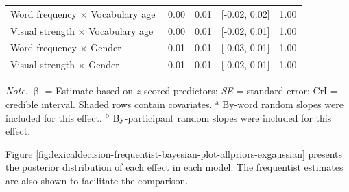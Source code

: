 \documentclass[
  12pt,
  man,floatsintext]{apa7}
\begin{document}
\begin{table}[!h]
\begin{threeparttable}
\begin{tabular}[t]{lrrrr}
\hspace{1em}Word frequency  $\times$  Vocabulary age & 0.00 & 0.01 & {}[-0.02, 0.02] & 1.00\\
\hspace{1em}Visual strength  $\times$  Vocabulary age & 0.00 & 0.01 & {}[-0.02, 0.01] & 1.00\\
\hspace{1em}Word frequency  $\times$  Gender & -0.01 & 0.01 & {}[-0.03, 0.01] & 1.00\\
\hspace{1em}Visual strength  $\times$  Gender & -0.01 & 0.01 & {}[-0.02, 0.01] & 1.00\\
\bottomrule
\end{tabular}
\begin{tablenotes}
\item \textit{\linebreak} 
\item \textit{Note}. $\upbeta$ = Estimate based on $z$-scored predictors; \textit{SE} = standard error; \linebreak \phantom{.}CrI = credible interval. Shaded rows contain covariates. \linebreak \linebreak \phantom{.}$^{\text{a}}$ By-word random slopes were included for this effect. \linebreak \phantom{.}$^{\text{b}}$ By-participant random slopes were included for this effect.
\end{tablenotes}
\end{threeparttable}
\end{table}

\clearpage

Figure \ref{fig:lexicaldecision-frequentist-bayesian-plot-allpriors-exgaussian} presents the posterior distribution of each effect in each model. The frequentist estimates are also shown to facilitate the comparison.
\end{document}
